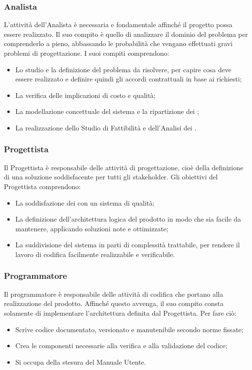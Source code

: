 \documentclass[NormeDiProgetto.tex]{subfiles}
\begin{document}
	\subsubsection{Analista}
	L'attività dell'Analista è necessaria e fondamentale affinché il progetto possa essere realizzato. Il suo compito è quello di analizzare il dominio del problema per comprenderlo a pieno, abbassando le probabilità che vengano effettuati gravi problemi di progettazione. I suoi compiti comprendono:
	\begin{itemize}
		\item Lo studio e la definizione del problema da risolvere, per capire cosa deve essere realizzato e definire quindi gli accordi contrattuali in base ai  richiesti;
		\item La verifica delle implicazioni di costo e qualità;
		\item La modellazione concettuale del sistema e la ripartizione dei ;
		\item La realizzazione dello Studio di Fattibilità e dell'Analisi dei .
	\end{itemize}
	\subsubsection{Progettista}
	Il Progettista è responsabile delle attività di progettazione, cioè della definizione di una soluzione soddisfacente per tutti gli stakeholder. Gli obiettivi del Progettista comprendono:
	\begin{itemize}
		\item La soddisfazione dei  con un sistema di qualità;
		\item La definizione dell'architettura logica del prodotto in modo che sia facile da mantenere, applicando soluzioni note e ottimizzate;
		\item La suddivisione del sistema in parti di complessità trattabile, per rendere il lavoro di codifica facilmente realizzabile e verificabile.
	\end{itemize} 

	\subsubsection{Programmatore}
	Il programmatore è responsabile delle attività di codifica che portano alla realizzazione del prodotto. Affinché questo avvenga, il suo compito consta solamente di implementare l'architettura definita dal Progettista. Per fare ciò:
	\begin{itemize}
		\item Scrive codice documentato, versionato e manutenibile secondo norme fissate;
		\item Crea le componenti necessarie alla verifica e alla validazione del codice;
		\item Si occupa della stesura del Manuale Utente.
	\end{itemize}
\end{document}
